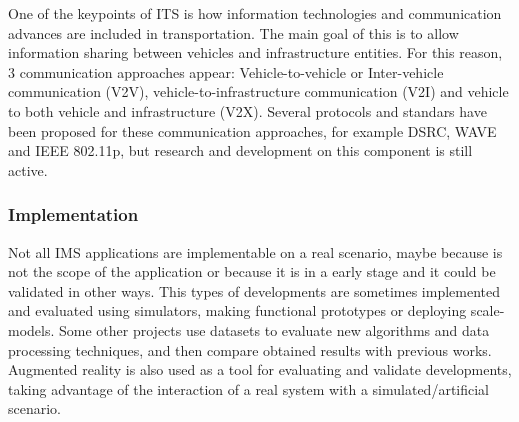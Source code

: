 One of the keypoints of ITS is how information technologies and communication advances are included in transportation. The main goal of this is to allow information sharing between vehicles and infrastructure entities. For this reason, 3 communication approaches appear: Vehicle-to-vehicle or Inter-vehicle communication (V2V), vehicle-to-infrastructure communication (V2I) and vehicle to both vehicle and infrastructure (V2X). Several protocols and standars have been proposed for these communication approaches, for example DSRC, WAVE and IEEE 802.11p, but research and development on this component is still active.

\subsubsection{Implementation}

Not all IMS applications are implementable on a real scenario, maybe because is not the scope of the application or because it is in a early stage and it could be validated in other ways. This types of developments are sometimes implemented and evaluated using simulators, making functional prototypes or deploying scale-models. Some other projects use datasets to evaluate new algorithms and data processing techniques, and then compare obtained results with previous works. Augmented reality is also used as a tool for evaluating and validate developments, taking advantage of the interaction of a real system with a simulated/artificial scenario.



